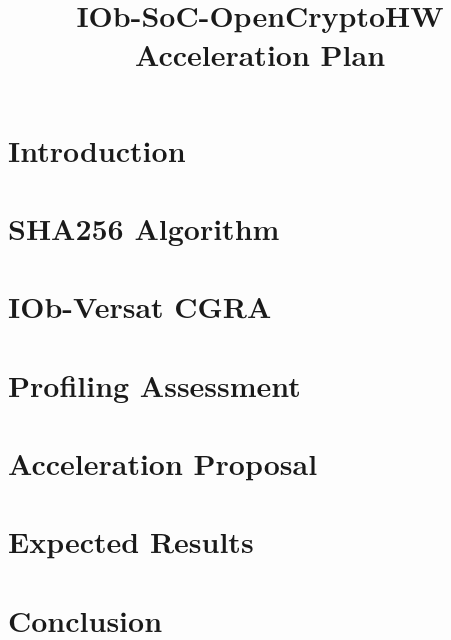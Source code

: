 \documentclass{plan}
\title{IOb-SoC-OpenCryptoHW Acceleration Plan}
\begin{document}
\maketitle
\cleardoublepage
\tableofcontents
\listoftables
\listoffigures
\cleardoublepage

\section{Introduction}
\label{sec:intro}


\section{SHA256 Algorithm}
\label{sec:sha256}


\section{IOb-Versat CGRA}
\label{sec:versat_CGRA}


\section{Profiling Assessment}
\label{sec:profiling}


\section{Acceleration Proposal}
\label{sec:accel_proposal}


\section{Expected Results}
\label{sec:expected_results}


\section{Conclusion}
\label{sec:conclusion}


{}


\end{document}
